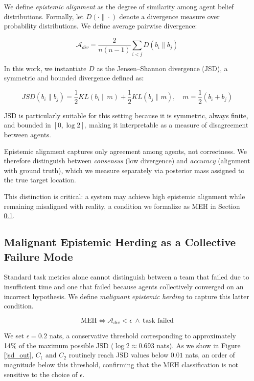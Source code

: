 \documentclass[pdflatex,sn-mathphys-num]{sn-jnl}%
\theoremstyle{thmstyleone}%
\theoremstyle{thmstyletwo}%
\theoremstyle{thmstylethree}%
\begin{document}
We define \textit{epistemic alignment} as the degree of similarity among agent belief distributions. Formally, let $D(\cdot \| \cdot)$ denote a divergence measure over probability distributions. We define average pairwise divergence:

\begin{equation}
\mathcal{A}_{div} = \frac{2}{n(n-1)} \sum_{i < j} D(b_i \| b_j)
\end{equation}

In this work, we instantiate $D$ as the Jensen--Shannon divergence (JSD), a symmetric and bounded divergence defined as:

\begin{equation}
JSD(b_i \| b_j) = \frac{1}{2} KL(b_i \| m) + \frac{1}{2} KL(b_j \| m), \quad m = \frac{1}{2}(b_i + b_j)
\end{equation}

JSD is particularly suitable for this setting because it is symmetric, always finite, and bounded in $[0, \log 2]$, making it interpretable as a measure of disagreement between agents.

Epistemic alignment captures only agreement among agents, not correctness. We therefore distinguish between \textit{consensus} (low divergence) and \textit{accuracy} (alignment with ground truth), which we measure separately via posterior mass assigned to the true target location.

This distinction is critical: a system may achieve high epistemic alignment while remaining misaligned with reality, a condition we formalize as MEH in Section \ref{silent_fail4}.

\subsection{Malignant Epistemic Herding as a Collective Failure Mode}
\label{silent_fail4}
Standard task metrics alone cannot distinguish between a team that failed due to insufficient time and one that failed because agents collectively converged on an incorrect hypothesis. We define \textit{malignant epistemic herding} to capture this latter condition.

\begin{equation}
\text{MEH} \iff \mathcal{A}_{div} < \epsilon \ \wedge \ \text{task failed}
\end{equation}

We set $\epsilon = 0.2$ nats, a conservative threshold corresponding to approximately 14\% of the maximum possible JSD ($\log 2 \approx 0.693$ nats). As we show in Figure \ref{jsd_out}, $C_1$ and $C_2$ routinely reach JSD values below $0.01$ nats, an order of magnitude below this threshold, confirming that the MEH classification is not sensitive to the choice of $\epsilon$.
\end{document}
